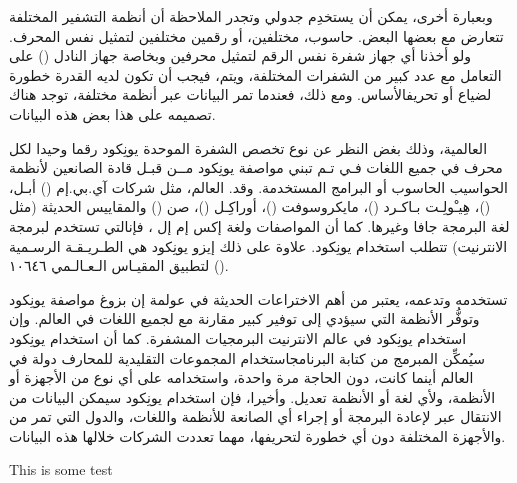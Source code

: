 وبعبارة أخرى، يمكن أن يستخدِم جدولي وتجدر الملاحظة أن أنظمة التشفير المختلفة تتعارض مع بعضها البعض. حاسوب، مختلفين، أو رقمين مختلفين لتمثيل نفس المحرف. ولو أخذنا أي جهاز شفرة نفس الرقم لتمثيل محرفين  وبخاصة جهاز النادل () على التعامل مع عدد كبير من الشفرات المختلفة، ويتم، فيجب أن تكون لديه القدرة خطورة لضياع أو تحريفالأساس. ومع ذلك، فعندما تمر البيانات عبر أنظمة مختلفة، توجد هناك تصميمه على هذا بعض هذه البيانات.


العالمية، وذلك بغض النظر عن نوع تخصص الشفرة الموحدة يونِكود رقما وحيدا لكل محرف في جميع اللغات فـي تـم تبني مواصفة يونِكود مــن قبـل قادة الصانعين لأنظمة الحواسيب الحاسوب أو البرامج المستخدمة. وقد. العالم، مثل شركات آي.بي.إم ()  أبـل، ()، هِيـْولِـت بـاكـرد ()،  مايكروسوفت ()،  أوراكِـل ()، صن ()  والمقاييس الحديثة (مثل لغة البرمجة جافا وغيرها. كما أن المواصفات   ولغة إكس إم إل ، فإنالتي تستخدم لبرمجة الانترنيت) تتطلب استخدام يونِكود. علاوة على ذلك إيزو يونِكود هي الطـريـقـة الرسـمية لتطبيق المقيـاس الـعـالـمي  ١٠٦٤٦   (). 

تستخدمه وتدعمه، يعتبر من أهم الاختراعات الحديثة في عولمة إن بزوغ مواصفة يونِكود وتوفُّر الأنظمة التي سيؤدي إلى توفير كبير مقارنة مع لجميع اللغات في العالم. وإن استخدام يونِكود في عالم الانترنيت البرمجيات المشفرة. كما أن استخدام يونِكود سيُمكِّن المبرمج من كتابة البرنامجاستخدام المجموعات التقليدية للمحارف دولة في العالم أينما كانت، دون الحاجة مرة واحدة، واستخدامه على أي نوع من الأجهزة أو الأنظمة، ولأي لغة أو الأنظمة تعديل. وأخيرا، فإن استخدام يونِكود سيمكن البيانات من الانتقال عبر لإعادة البرمجة أو إجراء أي الصانعة للأنظمة واللغات، والدول التي تمر من والأجهزة المختلفة دون أي خطورة لتحريفها، مهما تعددت الشركات خلالها هذه البيانات.


This is some test
\bye
